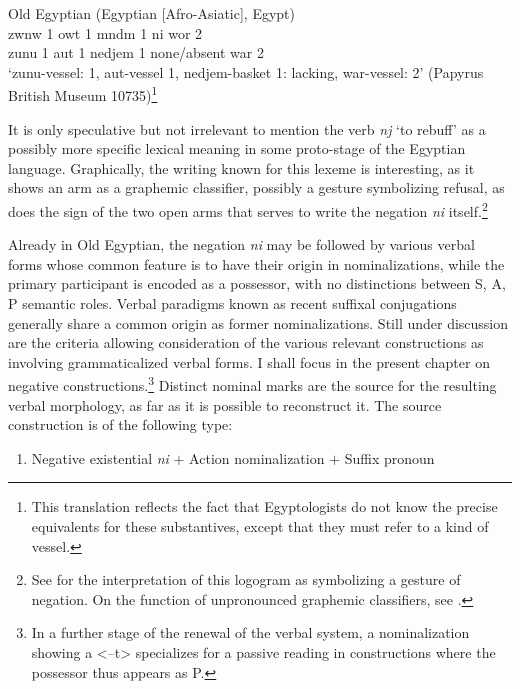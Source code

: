 \documentclass[output=paper]{langsci/langscibook}
\begin{document}
\ea Old Egyptian (Egyptian [Afro-Asiatic], Egypt) \label{ex:AE3}\\
	\gll zwnw 1 owt 1 mndm 1 ni wor 2\\ 
	zunu 1 aut 1 nedjem 1 none/absent war 2\\
	\glt ‘zunu-vessel: 1, aut-vessel 1, nedjem-basket 1: lacking, war-vessel: 2’ (Papyrus	British Museum 10735)\footnote{This translation reflects the fact that Egyptologists do not know the precise equivalents for these substantives, except that they must refer to a kind of vessel.}
\z 

It is only speculative but not irrelevant to mention the verb \textit{nj} ‘to rebuff’ as a possibly more specific lexical meaning in some proto-stage of the Egyptian language. Graphically, the writing known for this lexeme is interesting, as it shows an arm as a graphemic classifier, possibly a gesture symbolizing refusal, as does the sign of the two open arms that serves to write the negation \textit{ni} itself.\footnote{See \citet[125]{Loprieno1995} for the interpretation of this logogram as symbolizing a gesture of negation. On the function of unpronounced graphemic classifiers, see \citet{GoldwasserGrinevald2012}.}

Already in Old Egyptian, the negation \textit{ni} may be followed by various verbal forms whose common feature is to have their origin in nominalizations, while the primary participant is encoded as a possessor, with no distinctions between S, A, P semantic roles. Verbal paradigms known as recent suffixal conjugations generally share a common origin as former nominalizations. Still under discussion are the criteria allowing consideration of the various relevant constructions as involving grammaticalized verbal forms. I shall focus in the present chapter on negative constructions.\footnote{In a further stage of the renewal of the verbal system, a nominalization showing a <–t> specializes for a passive reading in constructions where the possessor thus appears as P.} Distinct nominal marks are the source for the resulting verbal morphology, as far as it is possible to reconstruct it. The source construction is of the following type: 

\begin{enumerate}[label=(\roman*)] %
	\item Negative existential \textit{ni} $+$ Action nominalization $+$ Suffix pronoun \\
\end{enumerate}
\end{document}
